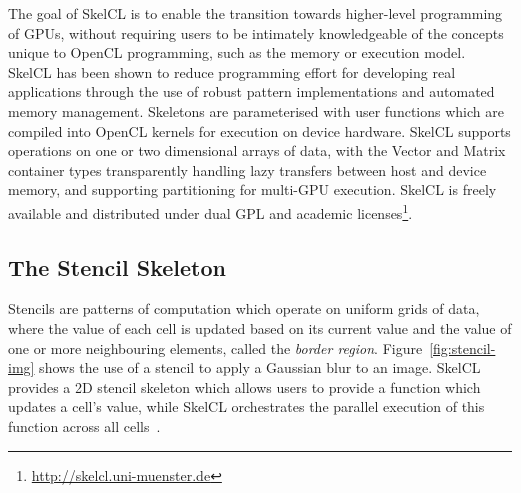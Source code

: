 \documentclass[nonatbib,preprint,9pt]{sigplanconf}
\begin{document}
The goal of SkelCL is to enable the transition towards higher-level
programming of GPUs, without requiring users to be intimately
knowledgeable of the concepts unique to OpenCL programming, such as
the memory or execution model. SkelCL has been shown to reduce
programming effort for developing real applications through the use of
robust pattern implementations and automated memory
management. Skeletons are parameterised with user functions which are
compiled into OpenCL kernels for execution on device hardware. SkelCL
supports operations on one or two dimensional arrays of data, with the
Vector and Matrix container types transparently handling lazy
transfers between host and device memory, and supporting partitioning
for multi-GPU execution. SkelCL is freely available and distributed
under dual GPL and academic
licenses\footnote{\url{http://skelcl.uni-muenster.de}}.

\subsection{The Stencil Skeleton}

Stencils are patterns of computation which operate on uniform grids of
data, where the value of each cell is updated based on its current
value and the value of one or more neighbouring elements, called the
\emph{border region}. Figure~\ref{fig:stencil-img} shows the use of a
stencil to apply a Gaussian blur to an image. SkelCL provides a 2D
stencil skeleton which allows users to provide a function which
updates a cell's value, while SkelCL orchestrates the parallel
execution of this function across all cells~\cite{Steuwer2014a}.
\end{document}

